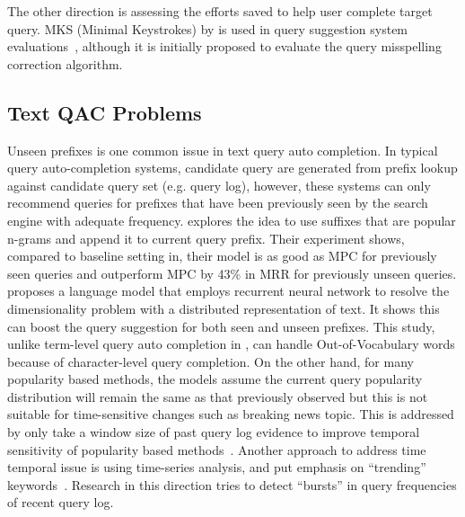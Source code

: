 \documentclass[12pt]{article} %
\begin{document}
The other direction is assessing the efforts saved to help user complete target query. 
MKS (Minimal Keystrokes) by \cite{duan_online_2011}
is used in query suggestion system evaluations~\cite{kharitonov_user_2013}, although it is initially proposed to evaluate the query misspelling correction algorithm.



\subsection{Text QAC Problems}
Unseen prefixes is one common issue in text query auto completion.
In typical query auto-completion systems, candidate query are generated from prefix lookup against candidate query set (e.g. query log), however, these systems
 can only recommend queries for prefixes that have been previously seen by the search engine with adequate frequency.
\cite{mitra_query_2015} explores the idea to use suffixes that are popular n-grams and append it to current query prefix.
Their experiment shows, compared to baseline setting in, their model is as good as MPC for previously seen queries and outperform MPC by 43\% in MRR for previously unseen queries.
\cite{park_neural_2017} proposes a language model that employs  recurrent neural network to resolve the dimensionality problem with a distributed representation of text.
It shows this can boost the query suggestion for both seen and unseen prefixes.
This study, unlike term-level query auto completion in \cite{vargas_term-by-term_2016}, can handle Out-of-Vocabulary words because of character-level query completion.
On the other hand, for many popularity based methods, the models assume the current query popularity distribution will remain the same as that previously observed but this is not suitable for time-sensitive changes such as breaking news topic. This is addressed by only take a window size of past query log evidence to improve temporal sensitivity of popularity based methods~\cite{cai_survey_2016}.
Another approach to address time temporal issue is using time-series analysis, and put emphasis on ``trending'' keywords~\cite{shokouhi_detecting_2011}.
Research in this direction tries to detect ``bursts'' in query frequencies of recent query log.
\end{document}
